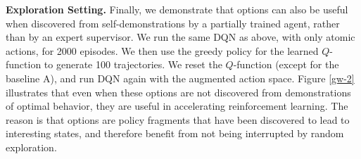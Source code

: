 {\bf Exploration Setting.} Finally, we demonstrate that options can also be useful when discovered from self-demonstrations by a partially trained agent, rather than by an expert supervisor. We run the same DQN as above, with only atomic actions, for 2000 episodes. We then use the greedy policy for the learned $Q$-function to generate 100 trajectories.  We reset the $Q$-function (except for the baseline \textsf{A}), and run DQN again with the augmented action space. Figure \ref{gw-2} illustrates that even when these options are not discovered from demonstrations of optimal behavior, they are useful in accelerating reinforcement learning.
The reason is that options are policy fragments that have been discovered to lead to interesting states, and therefore benefit from not being interrupted by random exploration. 




